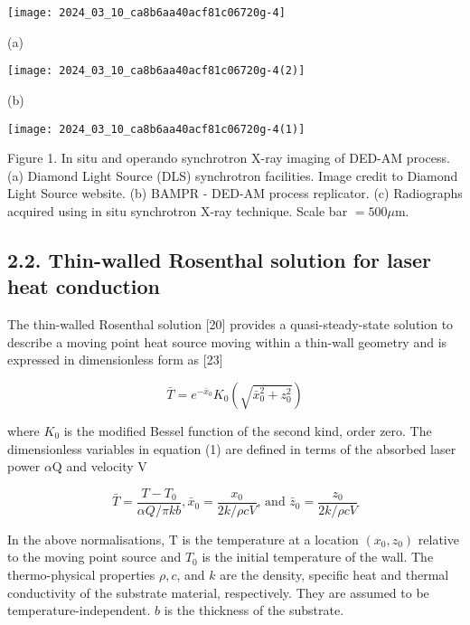 \documentclass[10pt]{article}
\begin{document}
\begin{center}
\texttt{[image: 2024\_03\_10\_ca8b6aa40acf81c06720g-4]}
\end{center}

(a)

\begin{center}
\texttt{[image: 2024\_03\_10\_ca8b6aa40acf81c06720g-4(2)]}
\end{center}

(b)

\begin{center}
\texttt{[image: 2024\_03\_10\_ca8b6aa40acf81c06720g-4(1)]}
\end{center}

Figure 1. In situ and operando synchrotron X-ray imaging of DED-AM process. (a) Diamond Light Source (DLS) synchrotron facilities. Image credit to Diamond Light Source website. (b) BAMPR - DED-AM process replicator. (c) Radiographs acquired using in situ synchrotron X-ray technique. Scale bar $=500 \mu \mathrm{m}$.

\subsection*{2.2. Thin-walled Rosenthal solution for laser heat conduction}
The thin-walled Rosenthal solution [20] provides a quasi-steady-state solution to describe a moving point heat source moving within a thin-wall geometry and is expressed in dimensionless form as [23]


\begin{equation*}
\bar{T}=e^{-\bar{x}_{0}} K_{0}\left(\sqrt{\bar{x}_{0}^{2}+z_{0}^{2}}\right) \tag{1}
\end{equation*}


where $K_{0}$ is the modified Bessel function of the second kind, order zero. The dimensionless variables in equation (1) are defined in terms of the absorbed laser power $\alpha \mathrm{Q}$ and velocity $\mathrm{V}$


\begin{equation*}
\bar{T}=\frac{T-T_{0}}{\alpha Q / \pi k b}, \bar{x}_{0}=\frac{x_{0}}{2 k / \rho c V} \text {, and } \bar{z}_{0}=\frac{z_{0}}{2 k / \rho c V} \tag{2}
\end{equation*}


In the above normalisations, $\mathrm{T}$ is the temperature at a location $\left(x_{0}, z_{0}\right)$ relative to the moving point source and $T_{0}$ is the initial temperature of the wall. The thermo-physical properties $\rho, c$, and $k$ are the density, specific heat and thermal conductivity of the substrate material, respectively. They are assumed to be temperature-independent. $b$ is the thickness of the substrate.
\end{document}
